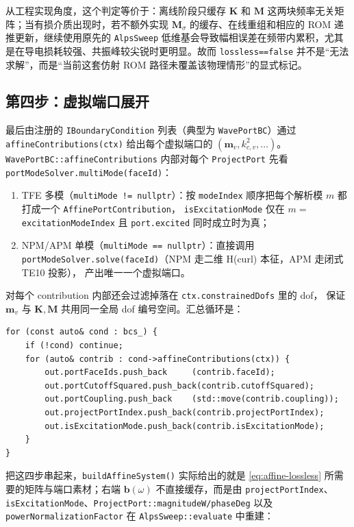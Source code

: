 \documentclass[UTF8,a4paper,11pt]{ctexart}
\newcommand{\code}[1]{\texttt{\small #1}}
\begin{document}
从工程实现角度，这个判定等价于：离线阶段只缓存 $\bm K$ 和 $\bm M$ 这两块频率无关矩阵；当有损介质出现时，若不额外实现 $\bm M_\sigma$ 的缓存、在线重组和相应的 ROM 递推更新，继续使用原先的 \code{AlpsSweep} 低维基会导致幅相误差在频带内累积，尤其是在导电损耗较强、共振峰较尖锐时更明显。故而 \code{lossless==false} 并不是“无法求解”，而是“当前这套仿射 ROM 路径未覆盖该物理情形”的显式标记。

\subsection{第四步：虚拟端口展开}
\label{sec:step-port}

最后由注册的 \code{IBoundaryCondition} 列表（典型为 \code{WavePortBC}）通过
\code{affineContributions(ctx)} 给出每个虚拟端口的 $(\bm m_v,k_{c,v}^{2},\dots)$。
\code{WavePortBC::affineContributions} 内部对每个 \code{ProjectPort} 先看
\code{portModeSolver.multiMode(faceId)}：
\begin{enumerate}
\item TFE 多模（\code{multiMode != nullptr}）：按 \code{modeIndex} 顺序把每个解析模 $m$
都打成一个 \code{AffinePortContribution}，
\code{isExcitationMode} 仅在 $m=\,$\code{excitationModeIndex} 且 \code{port.excited}
同时成立时为真；
\item NPM/APM 单模（\code{multiMode == nullptr}）：直接调用
\code{portModeSolver.solve(faceId)}（NPM 走二维 H(curl) 本征，APM 走闭式 TE10 投影），
产出唯一一个虚拟端口。
\end{enumerate}
对每个 contribution 内部还会过滤掉落在 \code{ctx.constrainedDofs} 里的 dof，
保证 $\bm m_v$ 与 $\bm K,\bm M$ 共用同一全局 dof 编号空间。汇总循环是：
\begin{lstlisting}
for (const auto& cond : bcs_) {
    if (!cond) continue;
    for (auto& contrib : cond->affineContributions(ctx)) {
        out.portFaceIds.push_back     (contrib.faceId);
        out.portCutoffSquared.push_back(contrib.cutoffSquared);
        out.portCoupling.push_back    (std::move(contrib.coupling));
        out.projectPortIndex.push_back(contrib.projectPortIndex);
        out.isExcitationMode.push_back(contrib.isExcitationMode);
    }
}
\end{lstlisting}

\bigskip

把这四步串起来，\code{buildAffineSystem()} 实际给出的就是 \eqref{eq:affine-lossless}
所需要的矩阵与端口素材；右端 $\bm b(\omega)$ 不直接缓存，而是由
\code{projectPortIndex}、\code{isExcitationMode}、\code{ProjectPort::magnitudeW/phaseDeg}
以及 \code{powerNormalizationFactor} 在 \code{AlpsSweep::evaluate} 中重建：
\end{document}
